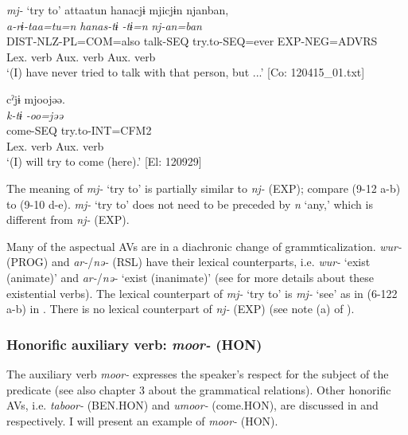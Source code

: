 \ea   \textit{mj-} ‘try to’ \label{ex:9.12}
\ea \label{ex:9.12a}%
 \gllll  attaatun  hanacjɨ  mjicjɨn  njanban,\\
      \textit{a-rɨ-taa=tu=n}  \textit{hanas-tɨ}  \textit{-tɨ=n}  \textit{nj-an=ban}\\
      DIST-NLZ-PL=COM=also  talk-SEQ  try.to-SEQ=ever  EXP-NEG=ADVRS\\
        {Lex. verb}  {Aux. verb}  {Aux. verb}\\
      \glt       ‘(I) have never tried to talk with that person, but ...’ [Co: 120415\_01.txt]

\ex \label{ex:9.12b} %
     \gllll  cˀjɨ  mjoojəə.\\
      \textit{k-tɨ}  \textit{-oo=jəə}\\
      come-SEQ  try.to-INT=CFM2\\
      {Lex. verb}  {Aux. verb}\\
      \glt       ‘(I) will try to come (here).’ [El: 120929]
     \z
\z

The meaning of \textit{mj-} ‘try to’ is partially similar to \textit{nj-} (EXP); compare (9-12 a-b) to (9-10 d-e). \textit{mj-} ‘try to’ does not need to be preceded by \textit{n} ‘any,’ which is different from \textit{nj-} (EXP).

  Many of the aspectual AVs are in a diachronic change of grammticalization. \textit{wur-} (PROG) and \textit{ar-}/\textit{nə-} (RSL) have their lexical counterparts, i.e. \textit{wur-} ‘exist (animate)’ and \textit{ar-}/\textit{nə-} ‘exist (inanimate)’ (see  for more details about these existential verbs). The lexical counterpart of \textit{mj-} ‘try to’ is \textit{mj-} ‘see’ as in (6-122 a-b) in . There is no lexical counterpart of \textit{nj-} (EXP) (see note (a) of ).

\subsubsection{Honorific auxiliary verb: \textit{moor-} (HON)}\label{sec:9.1.1.2}

The auxiliary verb \textit{moor-} expresses the speaker’s respect for the subject of the predicate (see also chapter 3 about the grammatical relations). Other honorific AVs, i.e. \textit{taboor-} (BEN.HON) and \textit{umoor-} (come.HON), are discussed in  and  respectively. I will present an example of \textit{moor-} (HON).

